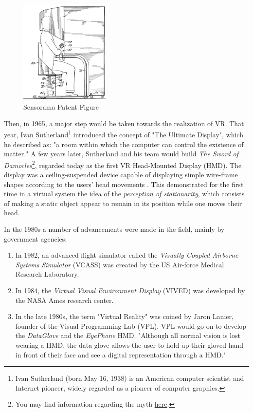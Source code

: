 \begin{figure}[ht!]%
\centering
\includegraphics[width=0.4\textwidth]{img/sensorama.png} 
\caption{Sensorama Patent Figure \cite{FileSens36online}}
\label{img:sensorama}
\end{figure}

Then, in 1965, a major step would be taken towards the realization of VR. That year, Ivan Sutherland\footnote{Ivan Sutherland (born May 16, 1938) is an American computer scientist and Internet pioneer, widely regarded as a pioneer of computer graphics.} introduced the concept of "The Ultimate Display", which he described as: "a room within which the computer can control the existence of matter." \cite{sutherland1965ultimate} A few years later, Sutherland and his team would build \textit{The Sword of Damocles}\footnote{You may find information regarding the myth \href{https://www.history.com/news/what-was-the-sword-of-damocles}{here}.}, regarded today as the first VR Head-Mounted Display (HMD). The display was a ceiling-suspended device capable of displaying simple wire-frame shapes according to the users' head movements \cite{hemstrom2020comparison}. This demonstrated for the first time in a virtual system the idea of the \textit{perception of stationarity}, which consists of making a static object appear to remain in its position while one moves their head. 

In the 1980s a number of advancements were made in the field, mainly by government agencies:

\begin{enumerate}
    \item In 1982, an advanced flight simulator called the \textit{Visually Coupled Airborne Systems Simulator} (VCASS) was created by the US Air-force Medical Research Laboratory.
    \item In 1984, the \textit{Virtual Visual Environment Display} (VIVED) was developed by the NASA Ames research center. 
    \item In the late 1980s, the term "Virtual Reality" was coined by Jaron Lanier, founder of the Visual Programming Lab (VPL). VPL would go on to develop the \textit{DataGlove} and the \textit{EyePhone} HMD. "Although all normal vision is lost wearing a HMD, the data glove allows the user to hold up their gloved hand in front of their face and see a digital representation through a HMD." \cite{dixon2006history}
\end{enumerate}

